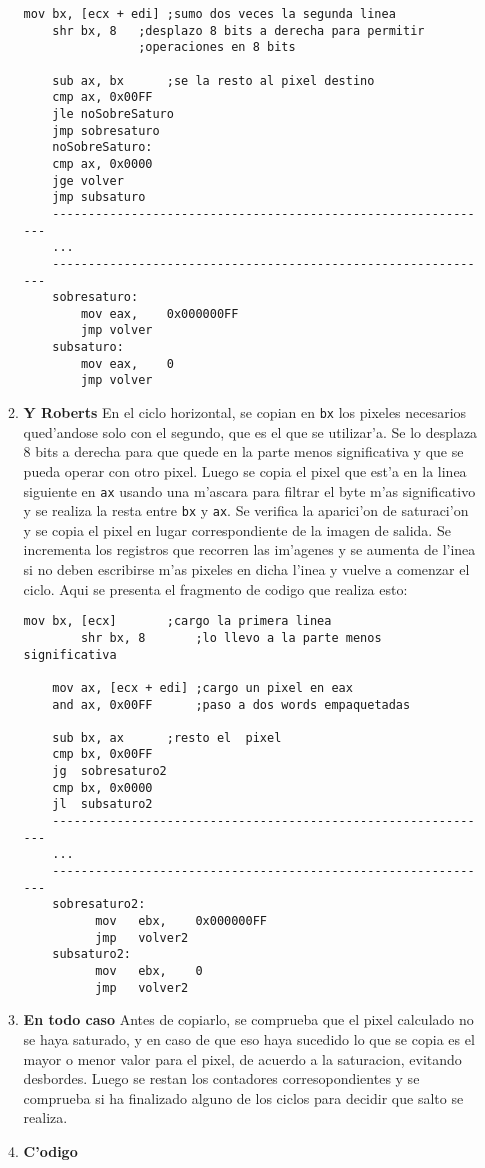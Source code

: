 \documentclass[11pt]{article}
\begin{document}
\begin{enumerate}
\begin{enumerate}
\begin{lstlisting}[frame=single]
	mov	bx,	[ecx + edi]	;sumo dos veces la segunda linea
	shr	bx,	8	;desplazo 8 bits a derecha para permitir
				;operaciones en 8 bits
	
	sub	ax,	bx		;se la resto al pixel destino
	cmp	ax,	0x00FF
	jle	noSobreSaturo
	jmp	sobresaturo
	noSobreSaturo:
	cmp	ax,	0x0000
	jge	volver
	jmp	subsaturo
	--------------------------------------------------------------
	...
	--------------------------------------------------------------
	sobresaturo:
		mov	eax,	0x000000FF
		jmp	volver
	subsaturo:
		mov	eax,	0
		jmp	volver
\end{lstlisting}
\item \textbf{Y Roberts}
\subitem En el ciclo horizontal, se copian en \verb'bx' los pixeles necesarios qued'andose solo con el segundo, que es el que se utilizar'a. Se lo desplaza 8 bits a derecha para que quede en la parte menos significativa y que se pueda operar con otro pixel. Luego se copia el pixel que est'a en la linea siguiente en \verb'ax' usando una m'ascara para filtrar el byte m'as significativo y se realiza la resta entre \verb'bx' y \verb'ax'. Se verifica la aparici'on de saturaci'on y se copia el pixel en lugar correspondiente de la imagen de salida.
Se incrementa los registros que recorren las im'agenes y se aumenta de l'inea si no deben escribirse m'as pixeles en dicha l'inea y vuelve a comenzar el ciclo. Aqui se presenta el fragmento de codigo que realiza esto:
\begin{lstlisting}[frame=single]
	mov	bx,	[ecx]		;cargo la primera linea
		shr	bx, 8		;lo llevo a la parte menos significativa
		
	mov	ax,	[ecx + edi]	;cargo un pixel en eax
	and	ax,	0x00FF		;paso a dos words empaquetadas
		
	sub	bx,	ax		;resto el  pixel
	cmp	bx,	0x00FF
	jg	sobresaturo2
	cmp	bx,	0x0000
	jl	subsaturo2
	--------------------------------------------------------------
	...
	--------------------------------------------------------------
	sobresaturo2:
	      mov	ebx,	0x000000FF
	      jmp	volver2
	subsaturo2:
	      mov	ebx,	0
	      jmp	volver2
\end{lstlisting}
\item \textbf{En todo caso}
\subitem Antes de copiarlo, se comprueba que el pixel calculado no se haya saturado, y en caso de que eso haya sucedido lo que se copia es el mayor o menor valor para el pixel, de acuerdo a la saturacion, evitando desbordes.
Luego se restan los contadores corresopondientes y se comprueba si ha finalizado alguno de los ciclos para decidir que salto se realiza.
\item \textbf{C'odigo}
\end{enumerate}



\end{enumerate}
\end{document}

